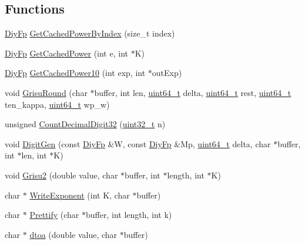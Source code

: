 \subsection*{Functions}
\begin{DoxyCompactItemize}
\item 
\hyperlink{structinternal_1_1DiyFp}{Diy\+Fp} \hyperlink{namespaceinternal_a3e95f043ed6c40cda1c1bc33c2f0ece2}{Get\+Cached\+Power\+By\+Index} (size\+\_\+t index)
\item 
\hyperlink{structinternal_1_1DiyFp}{Diy\+Fp} \hyperlink{namespaceinternal_abac3dbfa1070756c37725829148f6038}{Get\+Cached\+Power} (int e, int $\ast$K)
\item 
\hyperlink{structinternal_1_1DiyFp}{Diy\+Fp} \hyperlink{namespaceinternal_a74b8503d044bf6c0a5e90c5bea3aba42}{Get\+Cached\+Power10} (int exp, int $\ast$out\+Exp)
\item 
void \hyperlink{namespaceinternal_a234e10bef097ccb2f202b7a133086e71}{Grisu\+Round} (char $\ast$buffer, int len, \hyperlink{stdint_8h_aec6fcb673ff035718c238c8c9d544c47}{uint64\+\_\+t} delta, \hyperlink{stdint_8h_aec6fcb673ff035718c238c8c9d544c47}{uint64\+\_\+t} rest, \hyperlink{stdint_8h_aec6fcb673ff035718c238c8c9d544c47}{uint64\+\_\+t} ten\+\_\+kappa, \hyperlink{stdint_8h_aec6fcb673ff035718c238c8c9d544c47}{uint64\+\_\+t} wp\+\_\+w)
\item 
unsigned \hyperlink{namespaceinternal_ab2e324c403dc7671f732e8959886a8d1}{Count\+Decimal\+Digit32} (\hyperlink{stdint_8h_a435d1572bf3f880d55459d9805097f62}{uint32\+\_\+t} n)
\item 
void \hyperlink{namespaceinternal_a47be9aea8d0f9cae49dc03dc046d2450}{Digit\+Gen} (const \hyperlink{structinternal_1_1DiyFp}{Diy\+Fp} \&W, const \hyperlink{structinternal_1_1DiyFp}{Diy\+Fp} \&Mp, \hyperlink{stdint_8h_aec6fcb673ff035718c238c8c9d544c47}{uint64\+\_\+t} delta, char $\ast$buffer, int $\ast$len, int $\ast$K)
\item 
void \hyperlink{namespaceinternal_aeb7b6c0784b644968003cbd1b9da57e3}{Grisu2} (double value, char $\ast$buffer, int $\ast$length, int $\ast$K)
\item 
char $\ast$ \hyperlink{namespaceinternal_acc9a114f2a03bb4c68e9ee99b9ca99c5}{Write\+Exponent} (int K, char $\ast$buffer)
\item 
char $\ast$ \hyperlink{namespaceinternal_a18aa7a3da7eb23f64a2eb7f3ed01a44a}{Prettify} (char $\ast$buffer, int length, int k)
\item 
char $\ast$ \hyperlink{namespaceinternal_a43bb02fa46863dcc2dc8a2484f7ad5b1}{dtoa} (double value, char $\ast$buffer)

\end{DoxyCompactItemize}
